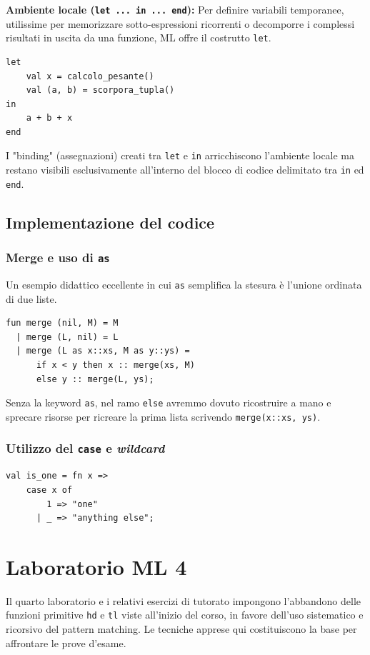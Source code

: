 \documentclass[12pt, a4paper]{article}
\begin{document}
\textbf{Ambiente locale (\texttt{let ... in ... end}):}
Per definire variabili temporanee, utilissime per memorizzare sotto-espressioni ricorrenti o decomporre i complessi risultati in uscita da una funzione, ML offre il costrutto \texttt{let}.
\begin{verbatim}
let 
    val x = calcolo_pesante()
    val (a, b) = scorpora_tupla() 
in 
    a + b + x
end
\end{verbatim}
I "binding" (assegnazioni) creati tra \texttt{let} e \texttt{in} arricchiscono l'ambiente locale ma restano visibili esclusivamente all'interno del blocco di codice delimitato tra \texttt{in} ed \texttt{end}.

\subsection{Implementazione del codice}

\subsubsection{Merge e uso di \texttt{as}}
Un esempio didattico eccellente in cui \texttt{as} semplifica la stesura è l'unione ordinata di due liste.
\begin{verbatim}
fun merge (nil, M) = M
  | merge (L, nil) = L
  | merge (L as x::xs, M as y::ys) =
      if x < y then x :: merge(xs, M)
      else y :: merge(L, ys);
\end{verbatim}
Senza la keyword \texttt{as}, nel ramo \texttt{else} avremmo dovuto ricostruire a mano e sprecare risorse per ricreare la prima lista scrivendo \texttt{merge(x::xs, ys)}.

\subsubsection{Utilizzo del \texttt{case} e \textit{wildcard}}
\begin{verbatim}
val is_one = fn x =>
    case x of
        1 => "one"
      | _ => "anything else";
\end{verbatim}


\section{Laboratorio ML 4}

Il quarto laboratorio e i relativi esercizi di tutorato impongono l'abbandono delle funzioni primitive \texttt{hd} e \texttt{tl} viste all'inizio del corso, in favore dell'uso sistematico e ricorsivo del pattern matching. Le tecniche apprese qui costituiscono la base per affrontare le prove d'esame.
\end{document}
